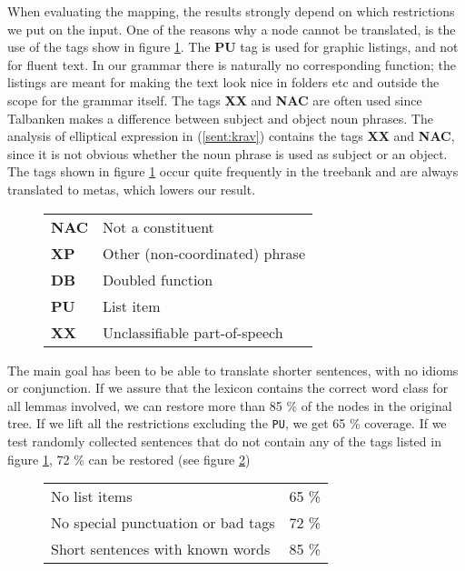 \documentclass[10pt, a4paper]{article}
\begin{document}
When evaluating the mapping, the results strongly depend on which restrictions we
put on the input. 
One of the reasons why a node cannot be translated, is the 
use of the tags show in figure \ref{fig:mapBadtag}.
The \textbf{PU} tag is used for graphic listings, and not for fluent text.
In our grammar there is naturally no corresponding function; 
the listings are meant for making the text look nice in
folders etc and outside the scope for the grammar itself. The tags \textbf{XX}
and \textbf{NAC} are often used since Talbanken makes a
difference between subject
and object noun phrases. %
The analysis of elliptical expression in (\ref{sent:krav})
\label{sent:krav}
contains the tags \textbf{XX} and \textbf{NAC}, since it is not obvious
whether the noun phrase is used as subject or an object.
The tags shown in figure \ref{fig:mapBadtag} occur quite frequently in the treebank and are always translated
to metas, which lowers our result. \\
\begin{figure}[h]
\begin{tabular}{ll}
\textbf{NAC} & Not a constituent\\
\textbf{XP} & Other (non-coordinated) phrase\\
\textbf{DB} & Doubled function\\
\textbf{PU} & List item\\
\textbf{XX} & Unclassifiable part-of-speech\\
\end{tabular}
\caption{}\label{fig:mapBadtag}
\end{figure}


The main goal has been to be able to translate shorter sentences, with no
idioms or conjunction.
If we assure that the lexicon contains the correct word class for all lemmas
involved, we
can restore more than 85 \% of the nodes in the original tree.
If we lift all the restrictions excluding the \verb|PU|, we get
65 \% coverage. 
If we test randomly collected sentences that do not contain any of the tags listed
in figure \ref{fig:mapBadtag}, 72 \% can be restored (see figure \ref{tab:mappres})

\begin{figure}[h]
\begin{tabular}{|ll|}
\hline
No list items & 65 \%\\
No special punctuation or bad tags& 72 \%\\
Short sentences with known words & 85 \%\\
\hline
\end{tabular}
\caption{}
\label{tab:mappres}
\end{figure}
\end{document}
